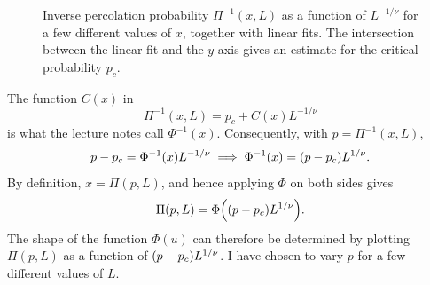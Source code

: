\documentclass[11pt,british,a4paper]{report}
\begin{document}
\begin{figure}[H]
    \caption{Inverse percolation probability \(\Pi^{-1}(x,L)\) as a function of \(L^{-1/\nu}\) for a few different values of \(x\), together with linear fits. The intersection between the linear fit and the \(y\) axis gives an estimate for the critical probability \(p_c\).}%
    \label{fig:n1}
\end{figure}
The function \(C(x)\) in
\begin{equation}
    \Pi^{-1}(x,L) = p_c + C(x)L^{-1/\nu}
\end{equation}
is what the lecture notes call \(\Phi^{-1}(x)\). Consequently, with \(p=\Pi^{-1}(x,L)\),
\begin{equation}
    p - p_c = \Phi^{-1}(x) L^{-1/\nu} \implies \Phi^{-1}(x) = \qty(p-p_c)L^{1/\nu}.
\end{equation}
By definition, \(x=\Pi(p,L)\), and hence applying \(\Phi\) on both sides gives
\begin{equation}
    \Pi(p,L) = \Phi\qty(\qty(p-p_c)L^{1/\nu}).
\end{equation}
The shape of the function \(\Phi(u)\) can therefore be determined by plotting \(\Pi(p,L)\) as a function of \(\qty(p-p_c)L^{1/\nu}\). I have chosen to vary \(p\) for a few different values of \(L\).
\end{document}

